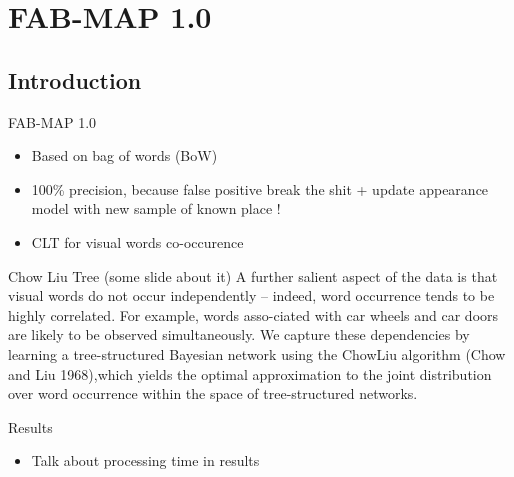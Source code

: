 \section{FAB-MAP 1.0}

\subsection{Introduction}
\begin{frame}{FAB-MAP 1.0}
    \begin{itemize}
        \item Based on bag of words (BoW)
        \item 100\% precision, because false positive break the shit + update appearance model with new sample of known place !
        \item CLT for visual words co-occurence
    \end{itemize}
    \note[item]{}
\end{frame}

\begin{frame}{Chow Liu Tree (some slide about it)}
    A further salient aspect of the data is that visual words do not occur independently – indeed, word occurrence tends to be highly correlated. For example, words asso-ciated with car wheels and car doors are likely to be observed simultaneously. We capture these dependencies by learning a tree-structured Bayesian network using the ChowLiu algorithm (Chow and Liu 1968),which yields the optimal approximation to the joint distribution over word occurrence within the space of tree-structured networks.
\end{frame}

\begin{frame}{Results}
    \begin{itemize}
        \item Talk about processing time in results
    \end{itemize}
\end{frame}

